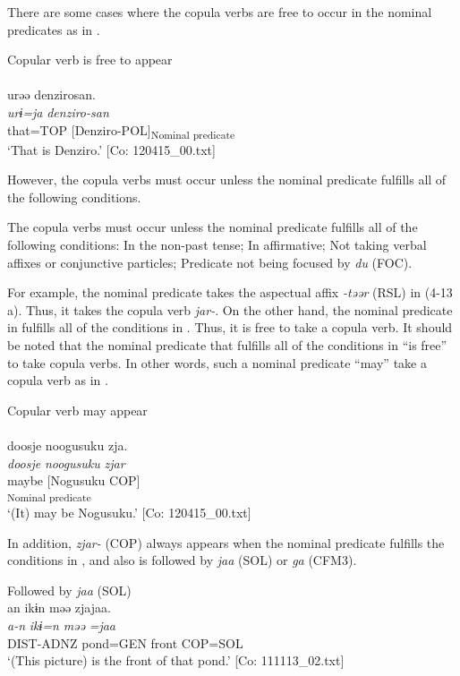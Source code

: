There are some cases where the copula verbs are free to occur in the nominal predicates as in .

\ea  Copular verb is free to appear \label{ex:4.14}\\\\
\glll    urəə  denzirosan.\\
    \textit{urɨ=ja}  \textit{denziro-san}\\
    that=TOP  [Denziro-POL]\textsubscript{Nominal predicate}\\
    \glt     ‘That is Denziro.’ [Co: 120415\_00.txt]
\z

However, the copula verbs must occur unless the nominal predicate fulfills all of the following conditions.

\ea  The copula verbs must occur unless the nominal predicate fulfills all of the following conditions: \label{ex:4.15}
  \ea  In the non-past tense;
  \ex  In affirmative;
  \ex  Not taking verbal affixes or conjunctive particles;
  \ex  Predicate not being focused by \textit{du} (FOC).
  \z
\z

For example, the nominal predicate takes the aspectual affix \textit{{}-təər} (RSL) in (4-13 a). Thus, it takes the copula verb \textit{jar-}. On the other hand, the nominal predicate in  fulfills all of the conditions in . Thus, it is free to take a copula verb. It should be noted that the nominal predicate that fulfills all of the conditions in  “is free” to take copula verbs. In other words, such a nominal predicate “may” take a copula verb as in .

\ea  Copular verb may appear \label{ex:4.16}\\\\
\gllll    doosje  noogusuku  zja.\\
    \textit{doosje}  \textit{noogusuku}  \textit{zjar}\\
    maybe  [Nogusuku  COP]\\
      [NP  Copular verb]\textsubscript{Nominal predicate}\\
    \glt     ‘(It) may be Nogusuku.’ [Co: 120415\_00.txt]
\z

  In addition, \textit{zjar-} (COP) always appears when the nominal predicate fulfills the conditions in , and also is followed by \textit{jaa} (SOL) or \textit{ga} (CFM3).

\ea  Followed by \textit{jaa} (SOL) \label{ex:4.17}\\
\glll  an  ikɨn  məə  zjajaa.\\
    \textit{a-n}  \textit{ikɨ=n}  \textit{məə}  \textit{=jaa}\\
    DIST-ADNZ  pond=GEN  front  COP=SOL\\
    \glt     ‘(This picture) is the front of that pond.’ [Co: 111113\_02.txt]
\z

